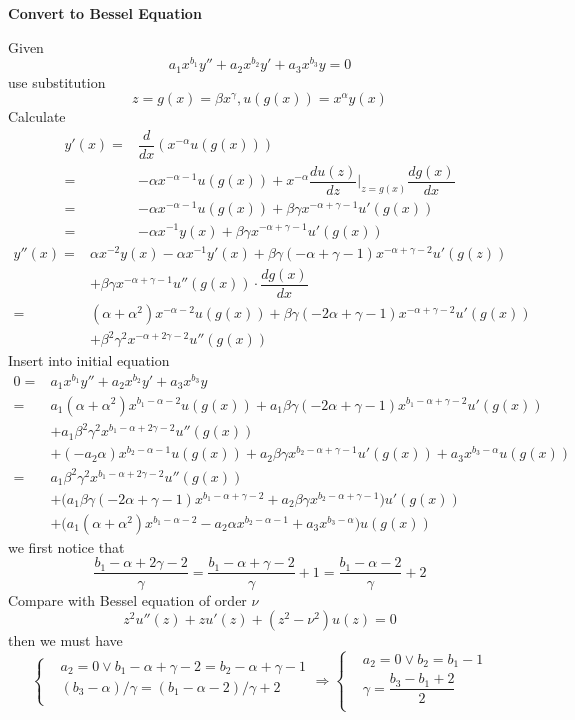 \documentclass[a4paper,12pt,titlepage]{report}
\begin{document}
\begin{center}\Huge
\textbf{Convert to Bessel Equation}
\end{center}
\vspace{1cm}
Given
$$a_1x^{b_1}y''+a_2x^{b_2}y'+a_3x^{b_3}y=0$$
use substitution
$$z=g(x)=\beta x^{\gamma},u(g(x))=x^{\alpha}y(x)$$
Calculate
\begin{align*}
y'(x)=&\dfrac{d}{dx}(x^{-\alpha}u(g(x)))\\
=&-\alpha x^{-\alpha-1}u(g(x))+x^{-\alpha}\dfrac{du(z)}{dz}\Big|_{z=g(x)}\dfrac{dg(x)}{dx}\\
=&-\alpha x^{-\alpha-1}u(g(x))+\beta\gamma x^{-\alpha+\gamma-1}u'(g(x))\\
=&-\alpha x^{-1}y(x)+\beta\gamma x^{-\alpha+\gamma-1}u'(g(x))
\end{align*}
\begin{align*}
y''(x)=&\alpha x^{-2}y(x)-\alpha x^{-1}y'(x)+\beta\gamma(-\alpha+\gamma-1)x^{-\alpha+\gamma-2}u'(g(z))\\
&+\beta\gamma x^{-\alpha+\gamma-1}u''(g(x))\cdot\dfrac{dg(x)}{dx}\\
=&(\alpha+\alpha^2)x^{-\alpha-2}u(g(x))+\beta\gamma(-2\alpha+\gamma-1)x^{-\alpha+\gamma-2}u'(g(x))\\
&+\beta^2\gamma^2x^{-\alpha+2\gamma-2}u''(g(x))
\end{align*}
Insert into initial equation
\begin{align*}
0=&a_1x^{b_1}y''+a_2x^{b_2}y'+a_3x^{b_3}y\\
=&a_1(\alpha+\alpha^2)x^{b_1-\alpha-2}u(g(x))+a_1\beta\gamma(-2\alpha+\gamma-1)x^{b_1-\alpha+\gamma-2}u'(g(x))\\
&+a_1\beta^2\gamma^2x^{b_1-\alpha+2\gamma-2}u''(g(x))\\
&+(-a_2\alpha) x^{b_2-\alpha-1}u(g(x))+a_2\beta\gamma x^{b_2-\alpha+\gamma-1}u'(g(x))+a_3x^{b_3-\alpha}u(g(x))\\
=&a_1\beta^2\gamma^2x^{b_1-\alpha+2\gamma-2}u''(g(x))\\
&+\Big(a_1\beta\gamma(-2\alpha+\gamma-1)x^{b_1-\alpha+\gamma-2}+a_2\beta\gamma x^{b_2-\alpha+\gamma-1}\Big)u'(g(x))\\
&+\Big(a_1(\alpha+\alpha^2)x^{b_1-\alpha-2}-a_2\alpha x^{b_2-\alpha-1}+a_3x^{b_3-\alpha}\Big)u(g(x))
\end{align*}
we first notice that
$$\dfrac{b_1-\alpha+2\gamma-2}{\gamma}=\dfrac{b_1-\alpha+\gamma-2}{\gamma}+1=\dfrac{b_1-\alpha-2}{\gamma}+2$$
Compare with Bessel equation of order $\nu$
$$z^2u''(z)+zu'(z)+(z^2-\nu^2)u(z)=0$$
then we must have
$$\left\{
\begin{aligned}
&a_2=0\vee b_1-\alpha+\gamma-2=b_2-\alpha+\gamma-1\\
&(b_3-\alpha)/\gamma=(b_1-\alpha-2)/\gamma+2\\
\end{aligned}
\right.\Rightarrow \left\{
\begin{aligned}
&a_2=0\vee b_2=b_1-1\\
&\gamma=\dfrac{b_3-b_1+2}{2}\\
\end{aligned}
\right.
$$
\end{document}

